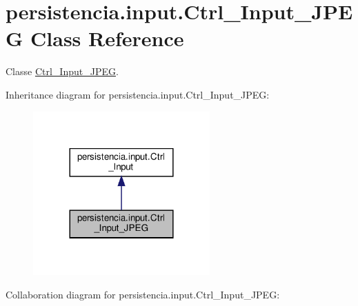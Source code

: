 \hypertarget{classpersistencia_1_1input_1_1Ctrl__Input__JPEG}{}\section{persistencia.\+input.\+Ctrl\+\_\+\+Input\+\_\+\+J\+P\+EG Class Reference}
\label{classpersistencia_1_1input_1_1Ctrl__Input__JPEG}


Classe \hyperlink{classpersistencia_1_1input_1_1Ctrl__Input__JPEG}{Ctrl\+\_\+\+Input\+\_\+\+J\+P\+EG}.  




Inheritance diagram for persistencia.\+input.\+Ctrl\+\_\+\+Input\+\_\+\+J\+P\+EG\+:\nopagebreak
\begin{figure}[H]
\begin{center}
\leavevmode
\includegraphics[width=192pt]{classpersistencia_1_1input_1_1Ctrl__Input__JPEG__inherit__graph}
\end{center}
\end{figure}


Collaboration diagram for persistencia.\+input.\+Ctrl\+\_\+\+Input\+\_\+\+J\+P\+EG\+:

